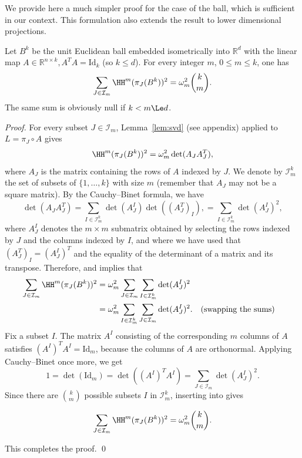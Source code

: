 We provide here a much simpler proof for the case of the ball, which
is sufficient in our context. This formulation also extends the result to lower dimensional projections.
\begin{theorem}\label{thm:ball-invariants}
Let $B^k$ be the unit Euclidean ball embedded isometrically into
$\mathbb{R}^d$ with the linear map $A\in\mathbb{R}^{n\times k}, A^T
A=\mathrm{Id}_k$ (so $k \le d$).  For every integer $m$, $0\le m\le k$, one has
\begin{equation}
  \label{eq:ball-invariants}
  \sum_{J \in \mathcal{I}_m} \HH^m(\pi_J(B^k))^2 = \omega_m^2 \binom{k}{m}.
\end{equation}
The same sum is obviously null if $k < m \Le d$.
\end{theorem}
\begin{proof}
For every subset $J \in \mathcal{I}_m$, Lemma~\ref{lem:svd} (see appendix) applied
to $L=\pi_J\circ A$ gives
\begin{equation}
  \label{eq-vol-proj-ball-1}
  \HH^m(\pi_J( B^k ))^2
  =\omega_m^2 \det(A_J A_J^T),
\end{equation}
where $A_J$ is the matrix containing the rows of $A$ indexed by
$J$. We denote by $\mathcal{I}^k_m$ the set of subsets of
$\{1,\dots,k\}$ with size $m$ (remember that $A_J$ may not be a square
matrix).  By the Cauchy--Binet formula, we have
\begin{equation}
  \label{eq-cauchy-binet-1}
\det(A_J A_J^T)
=
\sum_{I \in \mathcal{I}^k_m}
\det(A_J^I) \det( (A_J^T)_I ),
=
\sum_{I \in \mathcal{I}^k_m}
\det(A_J^I)^2,
\end{equation}
where $A_J^I$ denotes the $m\times m$ submatrix obtained by selecting
the rows indexed by $J$ and the columns indexed by $I$, and where we
have used that $(A_J^T)_I = (A_J^I)^T$ and the equality of the
determinant of a matrix and its transpose.
Therefore,  and  implies that
\begin{align}
  \sum_{J \in \mathcal{I}_m}
  \HH^m(\pi_J(B^k))^2
  & =
  \omega_m^2
  \sum_{J \in \mathcal{I}_m}
  \sum_{I \in \mathcal{I}^k_m}
  \det(A_J^I)^2
  \nonumber \\
  \label{eq-proj-vol-ball-2}
  & =
  \omega_m^2
  \sum_{I \in \mathcal{I}^k_m}
  \sum_{J \in \mathcal{I}_m}
  \det(A_J^I)^2.
  && \text{(swapping the sums)}
\end{align}
Fix a subset $I$. The matrix $A^I$ consisting of the corresponding $m$
columns of $A$ satisfies $(A^I)^T A^I=\mathrm{Id}_m$, because the
columns of $A$ are orthonormal.
Applying Cauchy--Binet once more, we get
\begin{equation}
  \label{eq-cauchy-binet-2}
  1 = \det(\mathrm{Id}_m) = \det((A^I)^T A^I) = \sum_{J \in \mathcal{I}_m} \det(A_J^I)^2.
\end{equation}
Since there are $\binom{k}{m}$ possible subsets $I$ in $\mathcal{I}^k_m$, inserting  into  gives

\[
\sum_{J \in \mathcal{I}_m}
\HH^m(\pi_J(B^k))^2
=
\omega_m^2
\binom{k}{m}.
\]

This completes the proof. \qed
\end{proof}
